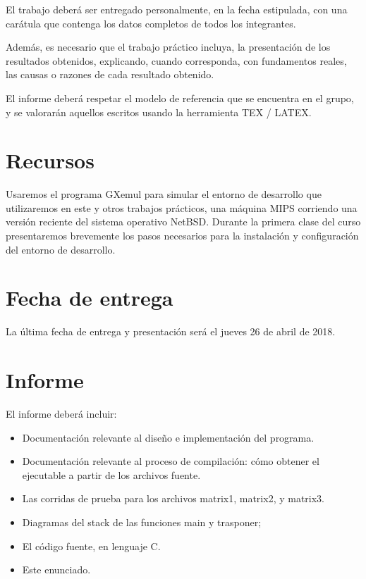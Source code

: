 \documentclass[11pt,a4paper]{article}
\begin{document}
El trabajo deber\'a ser entregado personalmente, en la fecha estipulada, con una car\'atula que contenga los datos completos de todos los integrantes.

Adem\'as, es necesario que el trabajo pr\'actico incluya, la presentaci\'on de los resultados obtenidos, explicando, cuando corresponda, con fundamentos reales, las causas o razones de cada resultado obtenido.

El informe deber\'a respetar el modelo de referencia que se encuentra en el grupo, y se valorar\'an aquellos escritos usando la herramienta TEX / LATEX.

\section{Recursos}

Usaremos el programa GXemul para simular el entorno de desarrollo que utilizaremos en este y otros trabajos prácticos, una máquina MIPS corriendo una versión reciente del sistema operativo NetBSD.
Durante la primera clase del curso presentaremos brevemente los pasos necesarios para la
instalación y configuración del entorno de desarrollo.

\section{Fecha de entrega}

La última fecha de entrega y presentación ser\'a el jueves 26 de abril de 2018.

\section{Informe}\label{informe}
El informe deberá incluir:
\begin{itemize}
\item Documentación relevante al diseño e implementación del programa.
\item Documentación relevante al proceso de compilación: cómo obtener el ejecutable a partir de los archivos fuente.
\item Las corridas de prueba para los archivos matrix1, matrix2, y matrix3.
\item Diagramas del stack de las funciones main y trasponer;
\item El código fuente, en lenguaje C.
\item Este enunciado.
\end{itemize}

\end{document}
